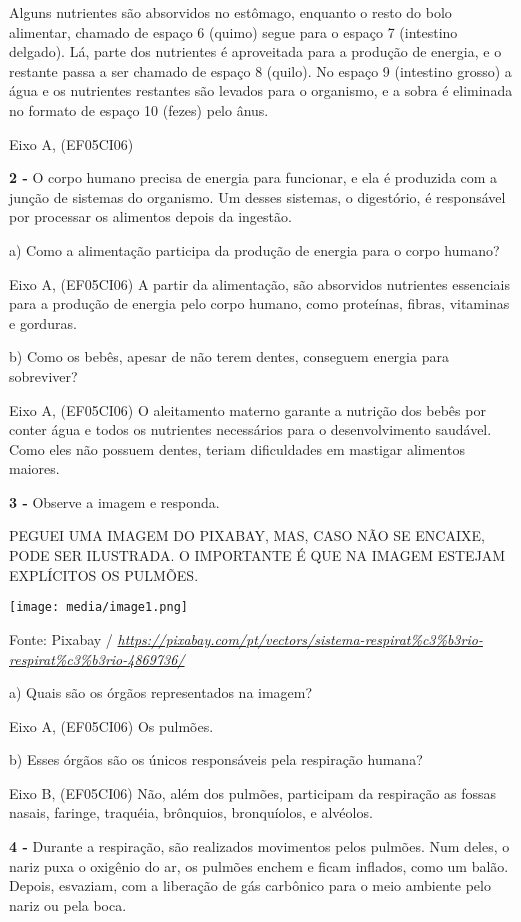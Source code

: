 Alguns nutrientes são absorvidos no estômago, enquanto o resto do bolo
alimentar, chamado de espaço 6 (quimo) segue para o espaço 7 (intestino
delgado). Lá, parte dos nutrientes é aproveitada para a produção de
energia, e o restante passa a ser chamado de espaço 8 (quilo). No espaço
9 (intestino grosso) a água e os nutrientes restantes são levados para o
organismo, e a sobra é eliminada no formato de espaço 10 (fezes) pelo
ânus.

Eixo A, (EF05CI06)

\textbf{2 -} O corpo humano precisa de energia para funcionar, e ela é
produzida com a junção de sistemas do organismo. Um desses sistemas, o
digestório, é responsável por processar os alimentos depois da ingestão.

a) Como a alimentação participa da produção de energia para o corpo
humano?

Eixo A, (EF05CI06) A partir da alimentação, são absorvidos nutrientes
essenciais para a produção de energia pelo corpo humano, como proteínas,
fibras, vitaminas e gorduras.

b) Como os bebês, apesar de não terem dentes, conseguem energia para
sobreviver?

Eixo A, (EF05CI06) O aleitamento materno garante a nutrição dos bebês
por conter água e todos os nutrientes necessários para o desenvolvimento
saudável. Como eles não possuem dentes, teriam dificuldades em mastigar
alimentos maiores.

\textbf{3 -} Observe a imagem e responda.

PEGUEI UMA IMAGEM DO PIXABAY, MAS, CASO NÃO SE ENCAIXE, PODE SER
ILUSTRADA. O IMPORTANTE É QUE NA IMAGEM ESTEJAM EXPLÍCITOS OS PULMÕES.

\texttt{[image: media/image1.png]}

Fonte: Pixabay /
\href{https://pixabay.com/pt/vectors/sistema-respirat\%c3\%b3rio-respirat\%c3\%b3rio-4869736/}{\emph{https://pixabay.com/pt/vectors/sistema-respirat\%c3\%b3rio-respirat\%c3\%b3rio-4869736/}}

a) Quais são os órgãos representados na imagem?

Eixo A, (EF05CI06) Os pulmões.

b) Esses órgãos são os únicos responsáveis pela respiração humana?

Eixo B, (EF05CI06) Não, além dos pulmões, participam da respiração as
fossas nasais, faringe, traquéia, brônquios, bronquíolos, e alvéolos.

\textbf{4 -} Durante a respiração, são realizados movimentos pelos
pulmões. Num deles, o nariz puxa o oxigênio do ar, os pulmões enchem e
ficam inflados, como um balão. Depois, esvaziam, com a liberação de gás
carbônico para o meio ambiente pelo nariz ou pela boca.

